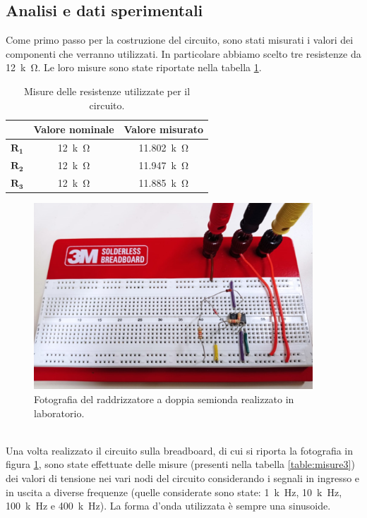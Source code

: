 \documentclass{report}
\begin{document}
\subsection{Analisi e dati sperimentali}
Come primo passo per la costruzione del circuito, sono stati misurati i valori dei componenti che verranno utilizzati. In particolare abbiamo scelto tre resistenze da \SI{12}{k\ohm}. Le loro misure sono state riportate nella tabella \ref{table:mis_res3}.
\begin{table}[h!]
	\centering
	\begin{tabular}{|c|c|c|}
		\cline{2-3} 
		\multicolumn{1}{c|}{} & \textbf{Valore nominale} & \textbf{Valore misurato}\\ 
		\hline
		$\mathbf{R_1}$ & \SI{12}{k\ohm} & \SI{11.802}{k\ohm} \\ 
		\hline
		$\mathbf{R_2}$ & \SI{12}{k\ohm} & \SI{11.947}{k\ohm} \\ 
		\hline
		$\mathbf{R_3}$ & \SI{12}{k\ohm} & \SI{11.885}{k\ohm} \\ 
		\hline
	\end{tabular}
	\caption{Misure delle resistenze utilizzate per il circuito.}
	\label{table:mis_res3}
\end{table}
\begin{figure}[h!]
	\centering
	\includegraphics[height=7cm]{immagini/circuito3}
	\caption{Fotografia del raddrizzatore a doppia semionda realizzato in laboratorio.}
	\label{figura:circuito3}
\end{figure}
\\Una volta realizzato il circuito sulla breadboard, di cui si riporta la fotografia in figura \ref{figura:circuito3}, sono state effettuate delle misure (presenti nella tabella \ref{table:misure3}) dei valori di tensione nei vari nodi del circuito considerando i segnali in ingresso e in uscita a diverse frequenze (quelle considerate sono state: \SI{1}{k\hertz}, \SI{10}{k\hertz}, \SI{100}{k\hertz} e \SI{400}{k\hertz}). La forma d'onda utilizzata è sempre una sinusoide.
\end{document}
